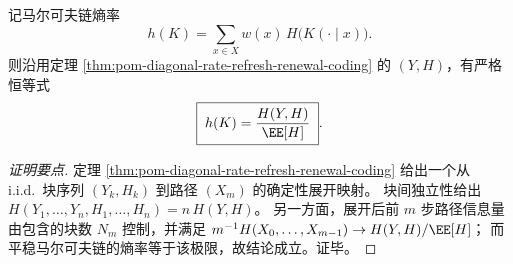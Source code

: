 \begin{proposition}[熵率的再生编码公式]\label{prop:pom-diagonal-rate-refresh-entropy-rate-renewal-coding}
记马尔可夫链熵率
\[
h(K)=\sum_{x\in X} w(x)\,H\!\bigl(K(\cdot\mid x)\bigr).
\]
则沿用定理 \ref{thm:pom-diagonal-rate-refresh-renewal-coding} 的 \((Y,H)\)，有严格恒等式
\[
\boxed{\;
h(K)=\frac{H(Y,H)}{\EE[H]}\; } .
\]
\end{proposition}
\begin{proof}[证明要点]
定理 \ref{thm:pom-diagonal-rate-refresh-renewal-coding} 给出一个从 i.i.d.\ 块序列 \((Y_k,H_k)\) 到路径 \((X_m)\) 的确定性展开映射。
块间独立性给出 \(H(Y_1,\dots,Y_n,H_1,\dots,H_n)=n\,H(Y,H)\)。
另一方面，展开后前 \(m\) 步路径信息量由包含的块数 \(N_m\) 控制，并满足
\(
m^{-1}H(X_0,\dots,X_{m-1})\to H(Y,H)/\EE[H]
\)；
而平稳马尔可夫链的熵率等于该极限，故结论成立。证毕。
\end{proof}

\endinput

